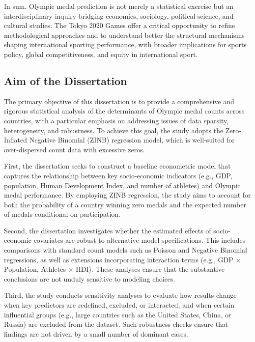 \documentclass[11pt,twoside]{article}
\numberwithin{Theorem}{section}
\numberwithin{Definition}{section}
\numberwithin{Lemma}{section}
\numberwithin{Algorithm}{section}
\numberwithin{equation}{section}
\begin{document}
In sum, Olympic medal prediction is not merely a statistical exercise but an interdisciplinary inquiry bridging economics, sociology, political science, and cultural studies. The Tokyo 2020 Games offer a critical opportunity to refine methodological approaches and to understand better the structural mechanisms shaping international sporting performance, with broader implications for sports policy, global competitiveness, and equity in international sport.


\subsection{Aim of the Dissertation}
\label{subsec:aim}

The primary objective of this dissertation is to provide a comprehensive and rigorous statistical analysis of the determinants of Olympic medal counts across countries, with a particular emphasis on addressing issues of data sparsity, heterogeneity, and robustness. To achieve this goal, the study adopts the Zero-Inflated Negative Binomial (ZINB) regression model, which is well-suited for over-dispersed count data with excessive zeros.  

First, the dissertation seeks to construct a baseline econometric model that captures the relationship between key socio-economic indicators (e.g., GDP, population, Human Development Index, and number of athletes) and Olympic medal performance. By employing ZINB regression, the study aims to account for both the probability of a country winning zero medals and the expected number of medals conditional on participation.  

Second, the dissertation investigates whether the estimated effects of socio-economic covariates are robust to alternative model specifications. This includes comparisons with standard count models such as Poisson and Negative Binomial regressions, as well as extensions incorporating interaction terms (e.g., GDP $\times$ Population, Athletes $\times$ HDI). These analyses ensure that the substantive conclusions are not unduly sensitive to modeling choices.  

Third, the study conducts sensitivity analyses to evaluate how results change when key predictors are redefined, excluded, or interacted, and when certain influential groups (e.g., large countries such as the United States, China, or Russia) are excluded from the dataset. Such robustness checks ensure that findings are not driven by a small number of dominant cases.  
\end{document}
